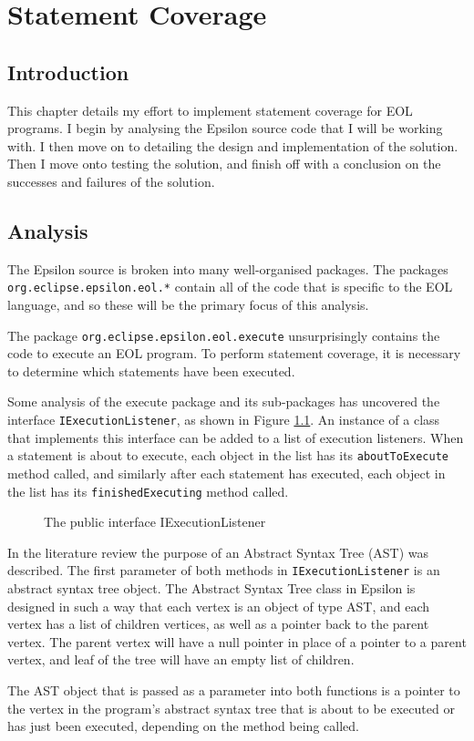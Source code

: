 \chapter{Statement Coverage}

\section{Introduction}

This chapter details my effort to implement statement coverage for EOL programs. I begin by analysing the Epsilon source code that I will be working with. I then move on to detailing the design and implementation of the solution. Then I move onto testing the solution, and finish off with a conclusion on the successes and failures of the solution.

\section{Analysis}

The Epsilon source is broken into many well-organised packages. The packages \verb+org.eclipse.epsilon.eol.*+ contain all of the code that is specific to the EOL language, and so these will be the primary focus of this analysis.

The package \verb+org.eclipse.epsilon.eol.execute+ unsurprisingly contains the code to execute an EOL program. To perform statement coverage, it is necessary to determine which statements have been executed. 

Some analysis of the execute package and its sub-packages has uncovered the interface \verb+IExecutionListener+, as shown in Figure \ref{lst:IExecutionListener}. An instance of a class that implements this interface can be added to a list of execution listeners. When a statement is about to execute, each object in the list has its \verb+aboutToExecute+ method called, and similarly after each statement has executed, each object in the list has its \verb+finishedExecuting+ method called.

\begin{figure}
	
	\caption{The public interface IExecutionListener}
	\label{lst:IExecutionListener}
\end{figure}

In the literature review the purpose of an Abstract Syntax Tree (AST) was described. The first parameter of both methods in \verb+IExecutionListener+ is an abstract syntax tree object. The Abstract Syntax Tree class in Epsilon is designed in such a way that each vertex is an object of type AST, and each vertex has a list of children vertices, as well as a pointer back to the parent vertex. The parent vertex will have a null pointer in place of a pointer to a parent vertex, and leaf of the tree will have an empty list of children.

The AST object that is passed as a parameter into both functions is a pointer to the vertex in the program's abstract syntax tree that is about to be executed or has just been executed, depending on the method being called.
